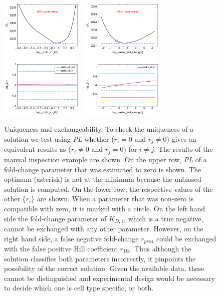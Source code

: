 \documentclass{bioinfo}
\begin{document}
\begin{figure}[!tpb]%
\centerline{\includegraphics[width=110pt]{Figures/uniqueness_1.pdf}~~\includegraphics[width=110pt]{Figures/uniqueness.pdf}}
\caption{Uniqueness and exchangeability. To check the uniqueness of a solution we test using \emph{PL} whether ($r_i=0$ and $r_j\neq0$) gives an equivalent results as ($r_i\neq0$ and $r_j=0$) for $i\neq j$. The results of the manual inspection example are shown. On the upper row, \emph{PL} of a fold-change parameter that was estimated to zero is shown. The optimum (asterisk) is not at the minimum because the unbiased solution is computed. On the lower row, the respective values of the other $\{r_i\}$ are shown. When a parameter that was non-zero is compatible with zero, it is marked with a circle. On the left hand side the fold-change parameter of $K_{D,1}$, which is a true negative, cannot be exchanged with any other parameter. However, on the right hand side, a false negative fold-change $r_{pro4}$ could be exchanged with the false positive Hill coefficient $r_{H8}$. Thus although the solution classifies both parameters incorrectly, it pinpoints the possibility of the correct solution. Given the available data, these cannot be distinguished and experimental design would be necessary to decide which one is cell type specific, or both.}\label{fig:07}
\end{figure}
\end{document}
